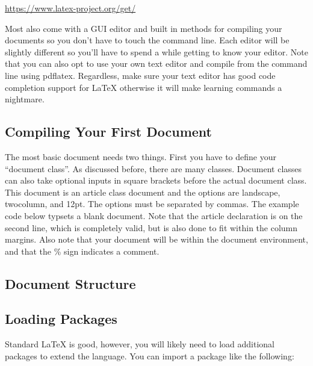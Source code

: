 \begin{center}
	\url{https://www.latex-project.org/get/}
\end{center}

Most also come with a GUI editor and built in methods for compiling your documents so you don't have to touch the command line. Each editor will be slightly different so you'll have to spend a while getting to know your editor. Note that you can also opt to use your own text editor and compile from the command line using pdflatex. Regardless, make sure your text editor has good code completion support for \LaTeX{} otherwise it will make learning commands a nightmare.


\subsection{Compiling Your First Document}

The most basic document needs two things. First you have to define your ``document class''. As discussed before, there are many classes. Document classes can also take optional inputs in square brackets before the actual document class. This document is an article class document and the options are landscape, twocolumn, and 12pt. The options must be separated by commas. The example code below typsets a blank document. Note that the article declaration is on the second line, which is completely valid, but is also done to fit within the column margins. Also note that your document will be within the document environment, and that the \% sign indicates a comment.

\begin{center}
\end{center}

\subsection{Document Structure}



\subsection{Loading Packages}
Standard \LaTeX{} is good, however, you will likely need to load additional packages to extend the language. You can import a package like the following:

